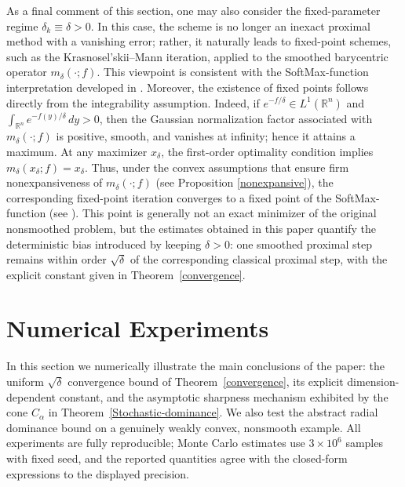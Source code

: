 \documentclass[11pt]{article}
\newcommand{\1}{\mathds{1}}
\theoremstyle{definition}
\theoremstyle{remark}
\theoremstyle{definition}
\begin{document}
As a final comment of this section, one may also consider the fixed-parameter regime
\(\delta_k\equiv\delta>0\). In this case, the scheme is no longer an
inexact proximal method with a vanishing error; rather, it naturally leads
to fixed-point schemes, such as the Krasnosel'skii--Mann iteration, applied
to the smoothed barycentric operator \(m_\delta(\cdot;f)\). This viewpoint
is consistent with the SoftMax-function interpretation developed in
\cite{NaldiLabarriereMolinariVilla2026}. Moreover, the existence of fixed
points follows directly from the integrability assumption. Indeed, if
\(e^{-f/\delta}\in L^1(\mathbb R^n)\) and
\(\int_{\mathbb R^n} e^{-f(y)/\delta}\,dy>0\), then the Gaussian
normalization factor associated with \(m_\delta(\cdot;f)\) is positive,
smooth, and vanishes at infinity; hence it attains a maximum. At any
maximizer \(x_\delta\), the first-order optimality condition implies
\(m_\delta(x_\delta;f)=x_\delta\). Thus, under the convex assumptions that
ensure firm nonexpansiveness of \(m_\delta(\cdot;f)\) (see Proposition \ref{nonexpansive}), the corresponding fixed-point iteration converges to a fixed point of the SoftMax-function (see \cite{NaldiLabarriereMolinariVilla2026}). This point is generally not an exact minimizer of the
original nonsmoothed problem, but the estimates obtained in this paper quantify the
deterministic bias introduced by keeping \(\delta>0\): one smoothed
proximal step remains within order \(\sqrt{\delta}\) of the corresponding
classical proximal step, with the explicit constant given in
Theorem~\ref{convergence}.


\section{Numerical Experiments}\label{numerics}

In this section we numerically illustrate the main conclusions of the paper:
the uniform $\sqrt{\delta}$ convergence bound of Theorem~\ref{convergence},
its explicit dimension-dependent constant, and the asymptotic sharpness
mechanism exhibited by the cone $C_\alpha$ in Theorem~\ref{Stochastic-dominance}. We also test the abstract radial dominance bound on a genuinely weakly convex, nonsmooth example. All experiments are fully reproducible; Monte Carlo estimates use $3\times 10^{6}$ samples with fixed seed, and the reported quantities agree with the closed-form expressions to the displayed precision.
\end{document}
